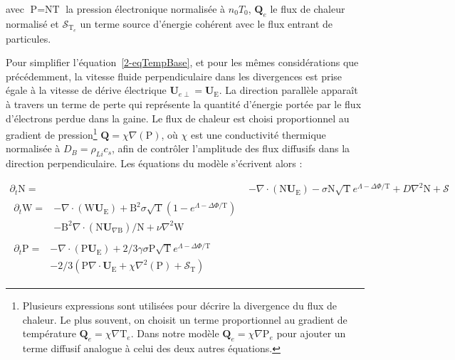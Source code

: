 \begin{refsection}
	avec $\text{P}=\text{NT}$ la pression électronique normalisée à $n_0T_0$,
	$\mathbf{Q}_e$ le flux de chaleur normalisé et $\mathcal{S}_{\text{T}_e}$ un
	terme source d'énergie cohérent avec le flux entrant de particules. 
	
	Pour simplifier l'équation~\ref{2-eqTempBase}, et pour les mêmes
	considérations que précédemment, la vitesse fluide perpendiculaire dans les
	divergences est prise égale à la vitesse de dérive électrique $\mathbf
	U_{e\perp}=\mathbf U_\text{E}$. La direction parallèle apparaît à travers un
	terme de perte qui représente la quantité d'énergie portée par le flux d'électrons
	perdue dans la gaine.
	Le flux de chaleur est choisi proportionnel au gradient de pression\footnote{Plusieurs expressions
	sont utilisées pour décrire la divergence du flux de chaleur. Le plus souvent,
	on choisit un terme proportionnel au gradient de température 
$\mathbf{Q}_e=\chi\nabla\text{T}_e$. Dans
notre modèle $\mathbf{Q}_e=\chi\nabla\text{P}_e$ pour ajouter un terme diffusif
analogue à celui des deux autres équations.}
$\mathbf{Q}=\chi\nabla(\text{P})$, où $\chi$ est une conductivité thermique
normalisée à $D_B=\rho_{Li}c_s$, afin de contrôler l'amplitude des flux
diffusifs dans la direction perpendiculaire.
	Les équations du modèle s'écrivent alors :
	
\begin{align}
\label{2-eqContinuiteTemp}
\partial_t \text{N}
=& - \nabla\cdot\left(\text{N}\mathbf U_\text{E}\right) -\sigma
\text{N}\sqrt{\text{T}}e^{\Lambda-\Delta\Phi/\text{T}} + D\nabla^2 \text{N}
+ \mathcal{S}
\\[0.5cm]
\label{2-eqCourantTemp}
\begin{split}
\partial_{t}\text{W} =& 
-\nabla\cdot\left(\text{W}\mathbf U_\text{E}\right)
+\text{B}^2\sigma\sqrt{\text{T}}\left(1-e^{\Lambda-\Delta\Phi/\text{T}}\right)\\
&-\text{B}^2\nabla\cdot\left(\text{N}\mathbf
U_{\nabla\text{B}}\right)/\text{N} +\nu\nabla^2\text{W}
\end{split}
\\[0.5cm]
\label{2-eqEnergyTemp}
\begin{split}
\partial_{t}\text{P}=&
-\nabla\cdot\left(\text{P}\mathbf U_\text{E}\right)
+2/3\gamma\sigma\text{P}\sqrt{\text{T}}e^{\Lambda-\Delta\Phi/\text{T}}\\
&-2/3\left(\text{P}\nabla\cdot\mathbf U_\text{E}
+\chi\nabla^2(\text{P})
+\mathcal{S}_{\text{T}}\right)
\end{split}
\end{align}


\end{refsection}
